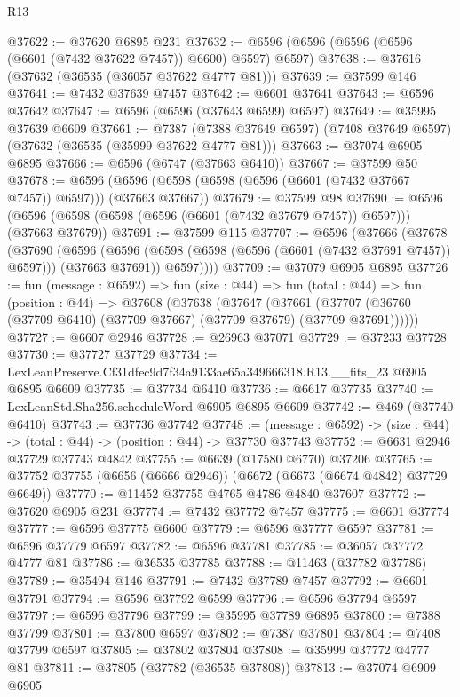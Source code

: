 \begin{lexlean}{R13}
\begin{coremodule}
@37622 := @37620 @6895 @231
@37632 := @6596 (@6596 (@6596 (@6596 (@6601 (@7432 @37622 @7457)) @6600) @6597) @6597)
@37638 := @37616 (@37632 (@36535 (@36057 @37622 @4777 @81)))
@37639 := @37599 @146
@37641 := @7432 @37639 @7457
@37642 := @6601 @37641
@37643 := @6596 @37642
@37647 := @6596 (@6596 (@37643 @6599) @6597)
@37649 := @35995 @37639 @6609
@37661 := @7387
    (@7388 @37649 @6597)
    (@7408 @37649 @6597)
    (@37632 (@36535 (@35999 @37622 @4777 @81)))
@37663 := @37074 @6905 @6895
@37666 := @6596 (@6747 (@37663 @6410))
@37667 := @37599 @50
@37678 := @6596 (@6596 (@6598 (@6598 (@6596 (@6601 (@7432 @37667 @7457)) @6597))) (@37663 @37667))
@37679 := @37599 @98
@37690 := @6596 (@6596 (@6598 (@6598 (@6596 (@6601 (@7432 @37679 @7457)) @6597))) (@37663 @37679))
@37691 := @37599 @115
@37707 := @6596
    (@37666
      (@37678
        (@37690
          (@6596
            (@6596 (@6598 (@6598 (@6596 (@6601 (@7432 @37691 @7457)) @6597))) (@37663 @37691))
            @6597))))
@37709 := @37079 @6905 @6895
@37726 := fun (message : @6592) =>
  fun (size : @44) =>
  fun (total : @44) =>
  fun (position : @44) =>
  @37608
    (@37638
      (@37647
        (@37661 (@37707 (@36760 (@37709 @6410) (@37709 @37667) (@37709 @37679) (@37709 @37691))))))
@37727 := @6607 @2946
@37728 := @26963 @37071
@37729 := @37233 @37728
@37730 := @37727 @37729
@37734 := LexLeanPreserve.Cf31dfec9d7f34a9133ae65a349666318.R13.__fits_23 @6905 @6895 @6609
@37735 := @37734 @6410
@37736 := @6617 @37735
@37740 := LexLeanStd.Sha256.scheduleWord @6905 @6895 @6609
@37742 := @469 (@37740 @6410)
@37743 := @37736 @37742
@37748 := (message : @6592) -> (size : @44) -> (total : @44) -> (position : @44) -> @37730 @37743
@37752 := @6631 @2946 @37729 @37743 @4842
@37755 := @6639 (@17580 @6770) @37206
@37765 := @37752 @37755 (@6656 (@6666 @2946)) (@6672 (@6673 (@6674 @4842) @37729 @6649))
@37770 := @11452 @37755 @4765 @4786 @4840 @37607
@37772 := @37620 @6905 @231
@37774 := @7432 @37772 @7457
@37775 := @6601 @37774
@37777 := @6596 @37775 @6600
@37779 := @6596 @37777 @6597
@37781 := @6596 @37779 @6597
@37782 := @6596 @37781
@37785 := @36057 @37772 @4777 @81
@37786 := @36535 @37785
@37788 := @11463 (@37782 @37786)
@37789 := @35494 @146
@37791 := @7432 @37789 @7457
@37792 := @6601 @37791
@37794 := @6596 @37792 @6599
@37796 := @6596 @37794 @6597
@37797 := @6596 @37796
@37799 := @35995 @37789 @6895
@37800 := @7388 @37799
@37801 := @37800 @6597
@37802 := @7387 @37801
@37804 := @7408 @37799 @6597
@37805 := @37802 @37804
@37808 := @35999 @37772 @4777 @81
@37811 := @37805 (@37782 (@36535 @37808))
@37813 := @37074 @6909 @6905

\end{coremodule}
\end{lexlean}
